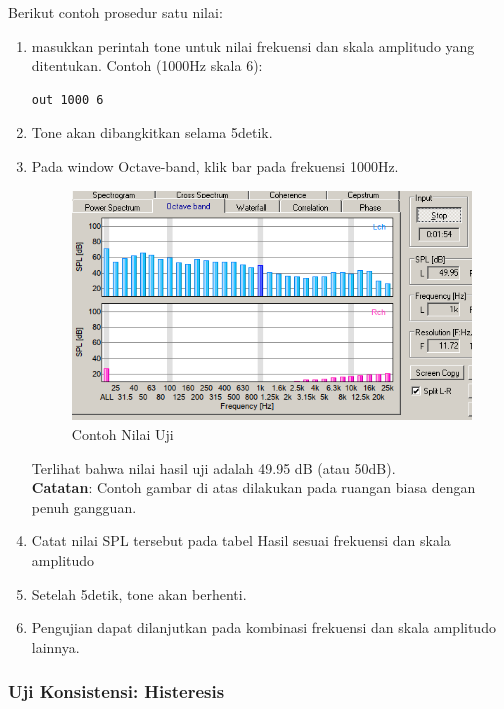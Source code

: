 \documentclass[12pt,]{article}
\begin{document}
	Berikut contoh prosedur satu nilai:
	\begin{enumerate}
		\item masukkan perintah tone untuk nilai frekuensi dan skala amplitudo yang ditentukan.
		Contoh (1000Hz skala 6):
		\begin{verbatim}
out 1000 6
		\end{verbatim}
		
		\item Tone akan dibangkitkan selama 5detik.
		
		\item Pada window Octave-band, klik bar pada frekuensi 1000Hz.
		
		\begin{figure}[!ht]
			\centering
			\includegraphics[width=300pt]{images/terminal/contoh}
			\caption{Contoh Nilai Uji}
		\end{figure}
		
		Terlihat bahwa nilai hasil uji adalah 49.95 dB (atau 50dB).\\
		\textbf{Catatan}: Contoh gambar di atas dilakukan pada ruangan biasa dengan penuh gangguan.
		
		\item Catat nilai SPL tersebut pada tabel Hasil sesuai frekuensi dan skala amplitudo
		
		\item Setelah 5detik, tone akan berhenti.
		
		\item Pengujian dapat dilanjutkan pada kombinasi frekuensi dan skala amplitudo lainnya.
	\end{enumerate}

	\newpage
	\subsubsection{Uji Konsistensi: Histeresis}
	
\end{document}

